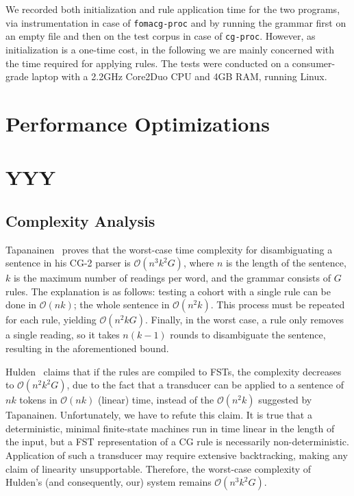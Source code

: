 \documentclass{article}
\begin{document}
We recorded both initialization and rule application time for the two programs,
via instrumentation in case of \texttt{fomacg-proc} and by running the grammar
first on an empty file and then on the test corpus in case of \texttt{cg-proc}.
However, as initialization is a one-time cost, in the following we are mainly
concerned with the time required for applying rules. The tests were conducted on
a consumer-grade laptop with a 2.2GHz Core2Duo CPU and 4GB RAM, running Linux.

\section{Performance Optimizations}
\label{sec:speed}

\section{YYY}

\subsection{Complexity Analysis}
\label{sec:complex}

Tapanainen~ proves that the worst-case time complexity
for disambiguating a sentence in his CG-2 parser is $\mathcal{O}(n^3k^2G)$,
where $n$ is the length of the sentence, $k$ is the maximum number of readings
per word, and the grammar consists of $G$ rules. The explanation is as follows:
testing a cohort with a single rule can be done in $\mathcal{O}(nk)$; 
the whole sentence in $\mathcal{O}(n^2k)$. This process must be repeated for
each rule, yielding $\mathcal{O}(n^2kG)$. Finally, in the worst case, a rule
only removes a single reading, so it takes $n(k - 1)$ rounds to disambiguate the
sentence, resulting in the aforementioned bound.

Hulden~ claims that if the rules are compiled to FSTs,
the complexity decreases to $\mathcal{O}(n^2k^2G)$, due to the fact that a
transducer can be applied to a sentence of $nk$ tokens in $\mathcal{O}(nk)$
(linear) time, instead of the $\mathcal{O}(n^2k)$ suggested by Tapanainen.
Unfortunately, we have to refute this claim. It is true that a deterministic,
minimal finite-state machines run in time linear in the length of the input,
but a FST representation of a CG rule is necessarily non-deterministic.
Application of such a transducer may require extensive backtracking, making any
claim of linearity unsupportable. Therefore, the worst-case complexity of
Hulden's (and consequently, our) system remains $\mathcal{O}(n^3k^2G)$.
\end{document}
